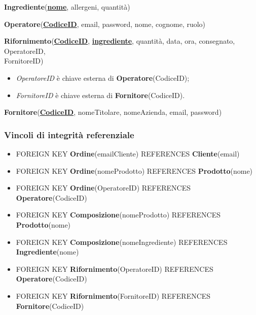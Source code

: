 \documentclass[12pt,a4paper]{article}
\begin{document}
    \begin{tcolorbox}[
        colback=gray!8,
        colframe=black!30,
        title=
    ]
        \textbf{Ingrediente}(\textbf{\uline{nome}}, allergeni, quantità)
    \end{tcolorbox}

    \begin{tcolorbox}[
        colback=gray!8,
        colframe=black!30,
        title=
    ]
        \textbf{Operatore}(\textbf{\uline{CodiceID}}, email, password, nome, cognome, ruolo)
    \end{tcolorbox}

    \begin{tcolorbox}[
        colback=gray!8,
        colframe=black!30,
        title=
    ]
        \textbf{Rifornimento}(\textbf{\uline{CodiceID}}, \textbf{\uline{ingrediente}}, quantità, data, ora, consegnato, OperatoreID, \\FornitoreID)
        \begin{itemize}[leftmargin=1em]
            \item \textit{OperatoreID} è chiave esterna di \textbf{Operatore}(CodiceID);
            \item \textit{FornitoreID} è chiave esterna di \textbf{Fornitore}(CodiceID).
        \end{itemize}
    \end{tcolorbox}

    \begin{tcolorbox}[
        colback=gray!8,
        colframe=black!30,
        title=
    ]
        \textbf{Fornitore}(\textbf{\uline{CodiceID}}, nomeTitolare, nomeAzienda, email, password) 
    \end{tcolorbox}
    
    \subsubsection{Vincoli di integrità referenziale}
    \begin{itemize}[leftmargin=1em]
        \item FOREIGN KEY \textbf{Ordine}(emailCliente) REFERENCES \textbf{Cliente}(email)
        \item FOREIGN KEY \textbf{Ordine}(nomeProdotto) REFERENCES \textbf{Prodotto}(nome)
        \item FOREIGN KEY \textbf{Ordine}(OperatoreID) REFERENCES \textbf{Operatore}(CodiceID)
        \item FOREIGN KEY \textbf{Composizione}(nomeProdotto) REFERENCES \textbf{Prodotto}(nome)
        \item FOREIGN KEY \textbf{Composizione}(nomeIngrediente) REFERENCES \textbf{Ingrediente}(nome)
        \item FOREIGN KEY \textbf{Rifornimento}(OperatoreID) REFERENCES \textbf{Operatore}(CodiceID)
        \item FOREIGN KEY \textbf{Rifornimento}(FornitoreID) REFERENCES \textbf{Fornitore}(CodiceID)
    \end{itemize}
 
\end{document}
